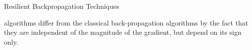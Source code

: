 \begin{chapter}{Resilient Backpropagation Techniques}
    \par {} algorithms differ from the classical back-propagation algorithms by the fact that they are independent of the magnitude of the gradient, but depend on its sign only.
    
    
    
\end{chapter}
